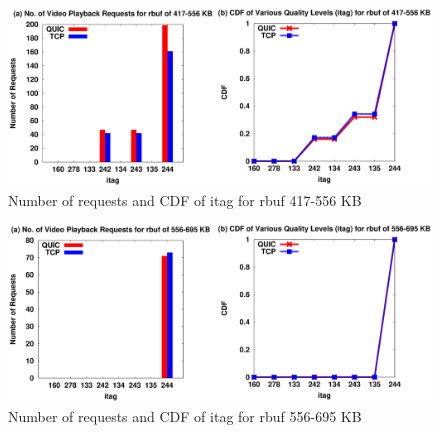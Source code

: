 \begin{figure}[!ht]
    \centering
    \includegraphics[width=0.9\linewidth]{img/CDF/plot_itag_569468}
    \caption{Number of requests and CDF of itag for rbuf 417-556 KB}
    \label{fig:itag65561}
\end{figure}
\begin{figure}[!ht]
    \centering
    \includegraphics[width=0.9\linewidth]{img/CDF/plot_itag_711837}
    \caption{Number of requests and CDF of itag for rbuf 556-695 KB}
    \label{fig:itag7611}
\end{figure}

